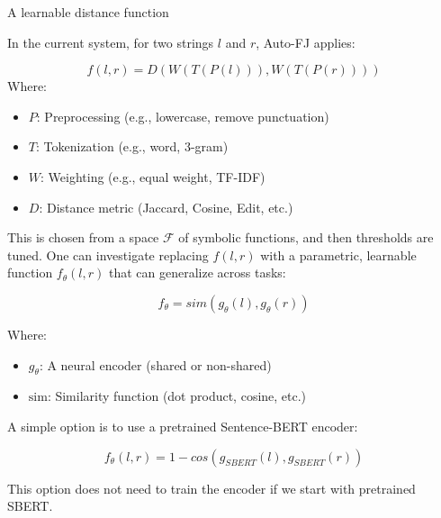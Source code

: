 \documentclass[8pt]{beamer} %
\begin{document}
\begin{frame}{A learnable distance function}
	

	In the current system, for two strings $l$ and $r$, Auto-FJ applies:
	
	$$f(l,r)=D(W(T(P(l))),W(T(P(r))))$$
	Where:
	
	\begin{itemize}
		\item $P$: Preprocessing (e.g., lowercase, remove punctuation)
		\item $T$: Tokenization (e.g., word, 3-gram)
		\item $W$: Weighting (e.g., equal weight, TF-IDF)
		\item $D$: Distance metric (Jaccard, Cosine, Edit, etc.)
	\end{itemize}
	
	This is chosen from a space $\mathcal{F}$ of symbolic functions, and then thresholds are tuned.
	One can investigate replacing $f(l, r)$ with a parametric, learnable function $f_\theta(l, r)$ that can generalize across tasks:

	$$f_{\theta} = sim(g_{\theta}(l),g_{\theta}(r))$$

	Where:

	\begin{itemize}
		\item $g_\theta$: A neural encoder (shared or non-shared)
		\item $\text{sim}$: Similarity function (dot product, cosine, etc.)
	\end{itemize}

	A simple option is to use a pretrained Sentence-BERT encoder:


	$$f_{\theta}(l,r)=1-cos(g_{SBERT}(l), g_{SBERT}	(r))$$

	This option does not need to train the encoder if we start with pretrained SBERT.

\end{frame}
\end{document}
